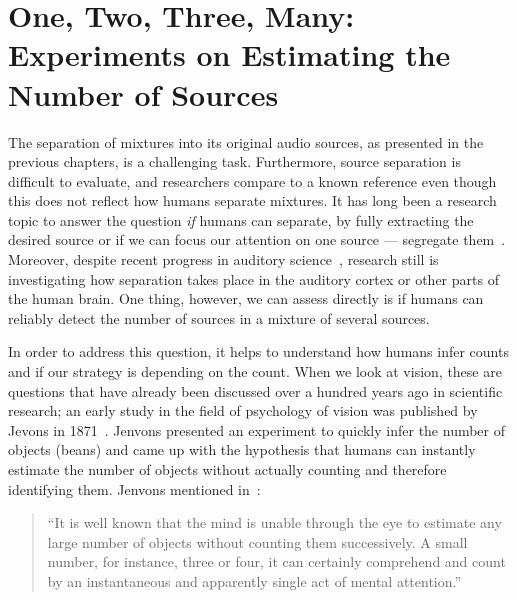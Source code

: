 \chapter[Experiments on Estimating the Number of Sources]{One, Two, Three, Many: Experiments on Estimating the Number of Sources}
\label{cha:countanalysis}
\bigskip
\bigskip
\bigskip
\bigskip
%
The separation of mixtures into its original audio sources, as presented in the previous chapters, is a challenging task.
Furthermore, source separation is difficult to evaluate, and researchers compare to a known reference even though this does not reflect how humans separate mixtures.
It has long been a research topic to answer the question \emph{if} humans can separate, by fully extracting the desired source or if we can focus our attention on one source --- segregate them~\cite{bregman90}.
Moreover, despite recent progress in auditory science~\cite{carlyon04, koelsch05, rabinowitz13}, research still is investigating how separation takes place in the auditory cortex or other parts of the human brain.
One thing, however, we can assess directly is if humans can reliably detect the number of sources in a mixture of several sources.
\par
In order to address this question, it helps to understand how humans infer counts and if our strategy is depending on the count.
When we look at vision, these are questions that have already been discussed over a hundred years ago in scientific research; an early study in the field of psychology of vision was published by Jevons in 1871~\cite{jevons1871}.
Jenvons presented an experiment to quickly infer the number of objects (beans) and came up with the hypothesis that humans can instantly estimate the number of objects without actually counting and therefore identifying them.
Jenvons mentioned in~\cite{jevons1871}:

\begin{quote}
``It is well known that the mind is unable through the eye to estimate any large number of objects without counting them successively. A small number, for instance, three or four, it can certainly comprehend and count by an instantaneous and apparently single act of mental attention.''
\end{quote}

